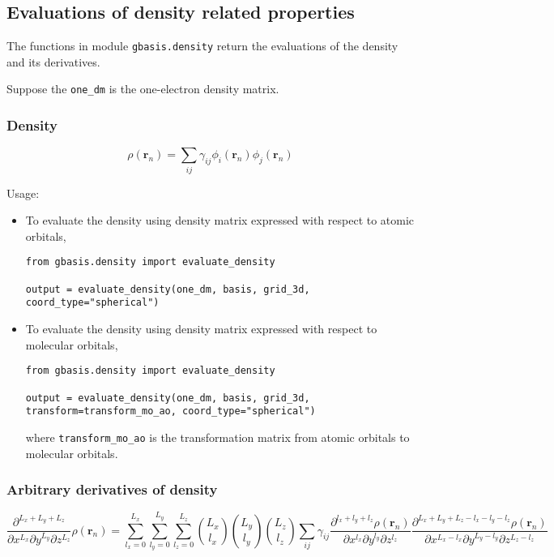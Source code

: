 \documentclass[letterpaper]{article}
\begin{document}
\subsection{Evaluations of density related properties}
The functions in module \verb|gbasis.density| return the evaluations of the
density and its derivatives.

Suppose the \verb|one_dm| is the one-electron density matrix.
\subsubsection{Density}
\begin{equation}
  \rho(\mathbf{r}_n) = \sum_{ij} \gamma_{ij} \phi_i(\mathbf{r}_n) \phi_j(\mathbf{r}_n)
\end{equation}

Usage:
\begin{itemize}
\item To evaluate the density using density matrix expressed with respect to
  atomic orbitals,
\begin{verbatim}
from gbasis.density import evaluate_density

output = evaluate_density(one_dm, basis, grid_3d, coord_type="spherical")
\end{verbatim}
\item To evaluate the density using density matrix expressed with respect to
  molecular orbitals,
\begin{verbatim}
from gbasis.density import evaluate_density

output = evaluate_density(one_dm, basis, grid_3d, transform=transform_mo_ao, coord_type="spherical")
\end{verbatim}
  where
  \verb|transform_mo_ao| is the transformation matrix from atomic orbitals
  to molecular orbitals.
\end{itemize}
\subsubsection{Arbitrary derivatives of density}
\begin{equation}
  \frac{\partial^{L_x + L_y + L_z}}{\partial x^{L_x} \partial y^{L_y} \partial z^{L_z}}
  \rho(\mathbf{r}_n)
  =
  \sum_{l_x=0}^{L_x} \sum_{l_y=0}^{L_y} \sum_{l_z=0}^{L_z}
  \binom{L_x}{l_x} \binom{L_y}{l_y} \binom{L_z}{l_z}
  \sum_{ij} \gamma_{ij}
  \frac{\partial^{l_x + l_y + l_z} \rho(\mathbf{r}_n)}{\partial x^{l_x} \partial y^{l_y} \partial z^{l_z}}
  \frac{
    \partial^{L_x + L_y + L_z - l_x - l_y - l_z} \rho(\mathbf{r}_n)
  }{
    \partial x^{L_x - l_x} \partial y^{L_y - l_y} \partial z^{L_z - l_z}
  }
\end{equation}
\end{document}

